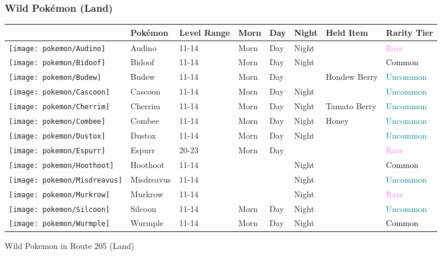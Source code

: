 \subsubsection{Wild Pokémon (Land)}%
\label{ssubsec:WildPokmon(Land)}%
\begin{longtable}{||l l l l l l l l||}%
\hline%
&Pokémon&Level Range&Morn&Day&Night&Held Item&Rarity Tier\\%
\hline%
\endhead%
\hline%
\texttt{[image: pokemon/Audino]}&Audino&11{-}14&Morn&Day&Night&&\textcolor{violet}{%
Rare%
}\\%
\hline%
\texttt{[image: pokemon/Bidoof]}&Bidoof&11{-}14&Morn&Day&Night&&\textcolor{black}{%
Common%
}\\%
\hline%
\texttt{[image: pokemon/Budew]}&Budew&11{-}14&Morn&Day&&Hondew Berry&\textcolor{teal}{%
Uncommon%
}\\%
\hline%
\texttt{[image: pokemon/Cascoon]}&Cascoon&11{-}14&Morn&Day&Night&&\textcolor{teal}{%
Uncommon%
}\\%
\hline%
\texttt{[image: pokemon/Cherrim]}&Cherrim&11{-}14&Morn&Day&Night&Tamato Berry&\textcolor{teal}{%
Uncommon%
}\\%
\hline%
\texttt{[image: pokemon/Combee]}&Combee&11{-}14&Morn&Day&Night&Honey&\textcolor{teal}{%
Uncommon%
}\\%
\hline%
\texttt{[image: pokemon/Dustox]}&Dustox&11{-}14&Morn&Day&Night&&\textcolor{teal}{%
Uncommon%
}\\%
\hline%
\texttt{[image: pokemon/Espurr]}&Espurr&20{-}23&Morn&Day&&&\textcolor{violet}{%
Rare%
}\\%
\hline%
\texttt{[image: pokemon/Hoothoot]}&Hoothoot&11{-}14&&&Night&&\textcolor{black}{%
Common%
}\\%
\hline%
\texttt{[image: pokemon/Misdreavus]}&Misdreavus&11{-}14&&&Night&&\textcolor{teal}{%
Uncommon%
}\\%
\hline%
\texttt{[image: pokemon/Murkrow]}&Murkrow&11{-}14&&&Night&&\textcolor{violet}{%
Rare%
}\\%
\hline%
\texttt{[image: pokemon/Silcoon]}&Silcoon&11{-}14&Morn&Day&Night&&\textcolor{teal}{%
Uncommon%
}\\%
\hline%
\texttt{[image: pokemon/Wurmple]}&Wurmple&11{-}14&Morn&Day&Night&&\textcolor{black}{%
Common%
}\\%
\hline%
\end{longtable}%
\caption{Wild Pokemon in Route 205 (Land)}